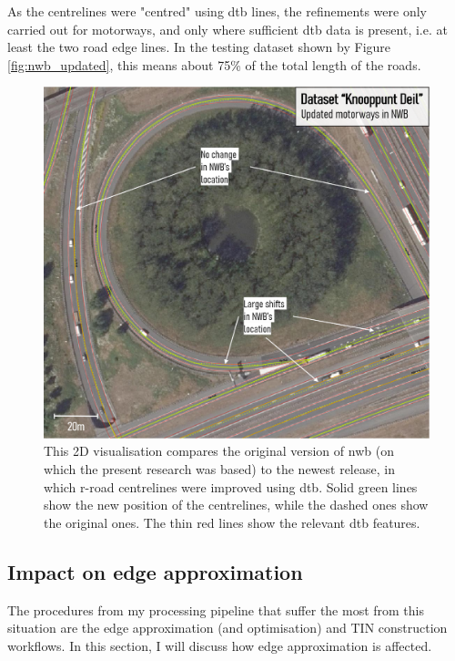 As the centrelines were "centred" using \ac{dtb} lines, the refinements were only carried out for motorways, and only where sufficient \ac{dtb} data is present, i.e. at least the two road edge lines. In the testing dataset shown by Figure \ref{fig:nwb_updated}, this means about 75\% of the total length of the roads.

\begin{figure}
    \centering
    \includegraphics[width=\linewidth]{final_report/figs/nwb_updated_geometry.png}
    \caption[Figure illustrating recent NWB improvements]{This 2D visualisation compares the original version of \ac{nwb} (on which the present research was based) to the newest release, in which \ac{r-road} centrelines were improved using \ac{dtb}. Solid green lines show the new position of the centrelines, while the dashed ones show the original ones. The thin red lines show the relevant \ac{dtb} features.}
    \label{fig:nwb_updated_geometry}
\end{figure}

\subsection{Impact on edge approximation}
\label{sub:nwb_updated_edgeapproximation}

The procedures from my processing pipeline that suffer the most from this situation are the edge approximation (and optimisation) and TIN construction workflows. In this section, I will discuss how edge approximation is affected.

